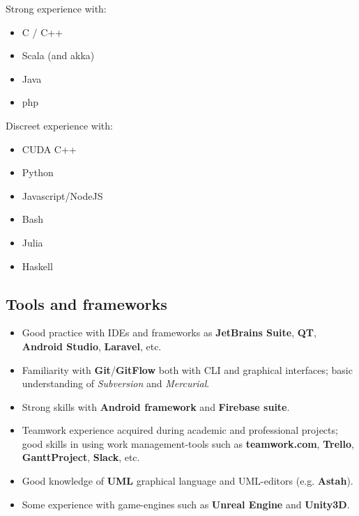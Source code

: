 \documentclass[letterpaper]{twentysecondcv} %
\begin{document}
\begin{minipage}[t]{0.45\linewidth}
	Strong experience with:
	\small
	\begin{itemize}[noitemsep]
		\item C / C++
		\item Scala (and akka)
		\item Java
		\item php
	\end{itemize}
\end{minipage}
\begin{minipage}[t]{0.45\linewidth}
	Discreet experience with:
	\footnotesize
	\begin{itemize}[noitemsep,nolistsep]
		\item CUDA C++
		\item Python
		\item Javascript/NodeJS
		\item Bash
		\item Julia
		\item Haskell
	\end{itemize}
\end{minipage}


\subsection{Tools and frameworks}
\begin{itemize}[noitemsep,nolistsep]
	\item Good practice with IDEs and frameworks as \textbf{JetBrains Suite}, \textbf{QT}, \textbf{Android Studio}, \textbf{Laravel}, etc.
	\item Familiarity with \textbf{Git}/\textbf{GitFlow} both with CLI and graphical interfaces; basic understanding of \textit{Subversion} and \textit{Mercurial}.
	\item Strong skills with \textbf{Android framework} and \textbf{Firebase suite}.
	\item Teamwork experience acquired during academic and professional projects; good skills in using work management-tools such as \textbf{teamwork.com}, \textbf{Trello}, \textbf{GanttProject}, \textbf{Slack}, etc.
	\item Good knowledge of \textbf{UML} graphical language and UML-editors (e.g. \textbf{Astah}).
	\item Some experience with game-engines such as \textbf{Unreal Engine} and \textbf{Unity3D}.
\end{itemize}
\end{document}

